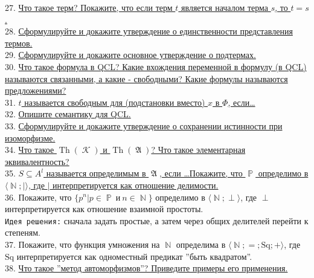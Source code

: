 \documentclass[a4paper,100pt]{article}
\theoremstyle{indented}
\theoremstyle{definition}
\theoremstyle{remark}
\DeclareMathOperator{\NN}{\mathbb{N}}
\DeclareMathOperator{\PP}{\mathbb{P}}
\DeclareMathOperator{\KK}{\mathscr{K}}
\DeclareMathOperator{\Th}{Th}
\DeclareMathOperator{\GA}{\mathfrak{A}}
\begin{document}
27. \hyperlink{b27}{Что такое терм? Покажите, что если терм $t$ является началом терма $s$, то $t=s$.} \\ 

28. \hyperlink{b28}{Сформулируйте и докажите утверждение о единственности представления термов.} \\ 

29. \hyperlink{b29}{Сформулируйте и докажите основное утверждение о подтермах.} \\ 

30. \hyperlink{b30}{Что такое формула в QCL? Какие вхождения переменной в формулу (в QCL) называются связанными, а какие - свободными? Какие формулы называются предложениями?} \\

31. \hyperlink{b31}{$t$ называется свободным для (подстановки вместо) $x$ в $\Phi$, если\dots} \\

32. \hyperlink{b32}{Опишите семантику для QCL.} \\ 

33. \hyperlink{b33}{Сформулируйте и докажите утверждение о сохранении истинности при изоморфизме.} \\ 

34. \hyperlink{b34}{Что такое $\Th(\KK)$ и $\Th(\GA)$? Что такое элементарная эквивалентность?} \\ 

35. \hyperlink{b35}{$S \subseteq A^l$ называется определимым в $\GA$, если \dots Покажите, что $\PP$ определимо в $\langle \NN; | \rangle$, где $|$ интерпретируется как отношение делимости.} \\ 

36. %
{Покажите, что $\{p^n| p\in \PP \: и \: n \in \NN\}$ определимо в $\langle \NN; \perp \rangle$, где $\perp$ интерпретируется как отношение взаимной простоты.} \\

\texttt{Идея решения:} сначала задать простые, а затем через общих делителей перейти к степеням. \\

37. %
{Покажите, что функция умножения на $\NN$ определима в $\langle \NN; =; \text{Sq}; + \rangle$, где $\text{Sq}$ интерпретируется как одноместный предикат ''быть квадратом''.} \\

38. \hyperlink{b38}{Что такое ''метод автоморфизмов''? Приведите примеры его применения.} \\
\end{document}
